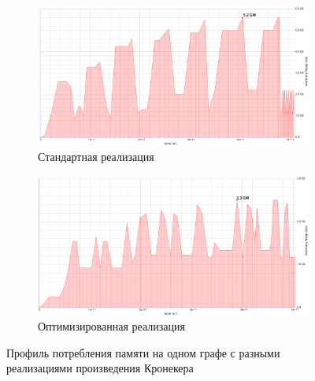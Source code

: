 \begin{figure}[]
    \begin{subfigure}{\textwidth}
        \centering
        \includegraphics[width=\linewidth]{figures/mem_prof_base.pdf}
        \caption{Стандартная реализация}
        \label{fig:memory_profile_a}
    \end{subfigure}
    \begin{subfigure}{\textwidth}
        \centering
        \includegraphics[width=\linewidth]{figures/mem_prof_patched.pdf}
        \caption{Оптимизированная реализация}
        \label{fig:memory_profile_b}
    \end{subfigure}
    \caption{Профиль потребления памяти на одном графе с разными реализациями произведения Кронекера}
    \label{fig:memory_profile}
\end{figure}

